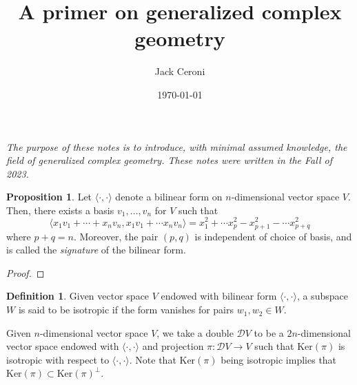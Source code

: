 \documentclass[aps,pra,showpacs,notitlepage,onecolumn,superscriptaddress,nofootinbib]{revtex4-1}
\newcommand{\hhrulefill}{\hspace{-1.0em}\hrulefill}
\theoremstyle{definition}
\newtheorem{definition}{Definition}[section]
\newtheorem{proposition}{Proposition}[section]
\begin{document}
\title{A primer on generalized complex geometry}
\author{Jack Ceroni}

\date{\today}

\maketitle

\hhrulefill

\noindent \emph{The purpose of these notes is to introduce, with minimal assumed knowledge, the field of generalized complex geometry. These notes were written in the Fall of 2023.}

\hhrulefill

\begin{proposition}
  Let $\langle \cdot, \cdot \rangle$ denote a bilinear form on $n$-dimensional vector space $V$. Then, there exists a basis $v_1, \dots, v_n$ for $V$ such that
  \begin{equation}
    \langle x_1 v_1 + \cdots + x_n v_n, x_1 v_1 + \cdots x_n v_n \rangle = x_1^2 + \cdots x_p^2 - x_{p + 1}^2 - \cdots x_{p + q}^2
  \end{equation}
  where $p + q = n$. Moreover, the pair $(p, q)$ is independent of choice of basis, and is called the \emph{signature} of the bilinear form.
\end{proposition}

\begin{proof}
  \end{proof}

\begin{definition}
  Given vector space $V$ endowed with bilinear form $\langle \cdot, \cdot \rangle$, a subspace $W$ is said to be isotropic if the form vanishes for pairs $w_1, w_2 \in W$.
\end{definition}

Given $n$-dimensional vector space $V$, we take a double $\mathcal{D}V$ to be a $2n$-dimensional vector space endowed with $\langle \cdot, \cdot \rangle$ and projection $\pi : \mathcal{D}V \rightarrow V$
such that $\text{Ker}(\pi)$ is isotropic with respect to $\langle \cdot, \cdot \rangle$. Note that $\text{Ker}(\pi)$ being isotropic implies that $\text{Ker}(\pi) \subset \text{Ker}(\pi)^{\perp}$.
\end{document}

